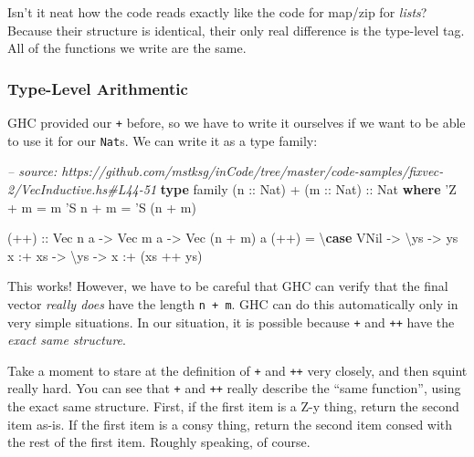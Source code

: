 \documentclass[]{article}
\newenvironment{Shaded}{}{}
\newcommand{\KeywordTok}[1]{\textcolor[rgb]{0.00,0.44,0.13}{\textbf{#1}}}
\newcommand{\DataTypeTok}[1]{\textcolor[rgb]{0.56,0.13,0.00}{#1}}
\newcommand{\CharTok}[1]{\textcolor[rgb]{0.25,0.44,0.63}{#1}}
\newcommand{\CommentTok}[1]{\textcolor[rgb]{0.38,0.63,0.69}{\textit{#1}}}
\newcommand{\OtherTok}[1]{\textcolor[rgb]{0.00,0.44,0.13}{#1}}
\newcommand{\FunctionTok}[1]{\textcolor[rgb]{0.02,0.16,0.49}{#1}}
\newcommand{\NormalTok}[1]{#1}
\begin{document}
Isn't it neat how the code reads exactly like the code for map/zip for
\emph{lists}? Because their structure is identical, their only real difference
is the type-level tag. All of the functions we write are the same.

\subsubsection{Type-Level Arithmentic}\label{type-level-arithmentic}

GHC provided our \texttt{+} before, so we have to write it ourselves if we want
to be able to use it for our \texttt{Nat}s. We can write it as a type family:

\begin{Shaded}
\begin{Highlighting}[]
\CommentTok{-- source: https://github.com/mstksg/inCode/tree/master/code-samples/fixvec-2/VecInductive.hs#L44-51}
\KeywordTok{type}\NormalTok{ family (}\OtherTok{n ::} \DataTypeTok{Nat}\NormalTok{) }\FunctionTok{+}\NormalTok{ (}\OtherTok{m ::} \DataTypeTok{Nat}\NormalTok{)}\OtherTok{ ::} \DataTypeTok{Nat} \KeywordTok{where}
    \CharTok{'Z   + m = m}
    \CharTok{'S n + m = '}\DataTypeTok{S}\NormalTok{ (n }\FunctionTok{+}\NormalTok{ m)}

\OtherTok{(++) ::} \DataTypeTok{Vec}\NormalTok{ n a }\OtherTok{->} \DataTypeTok{Vec}\NormalTok{ m a }\OtherTok{->} \DataTypeTok{Vec}\NormalTok{ (n }\FunctionTok{+}\NormalTok{ m) a}
\NormalTok{(}\FunctionTok{++}\NormalTok{) }\FunctionTok{=}\NormalTok{ \textbackslash{}}\KeywordTok{case}
    \DataTypeTok{VNil}    \OtherTok{->}\NormalTok{ \textbackslash{}ys }\OtherTok{->}\NormalTok{ ys}
\NormalTok{    x }\FunctionTok{:+}\NormalTok{ xs }\OtherTok{->}\NormalTok{ \textbackslash{}ys }\OtherTok{->}\NormalTok{ x }\FunctionTok{:+}\NormalTok{ (xs }\FunctionTok{++}\NormalTok{ ys)}
\end{Highlighting}
\end{Shaded}

This works! However, we have to be careful that GHC can verify that the final
vector \emph{really does} have the length \texttt{n\ +\ m}. GHC can do this
automatically only in very simple situations. In our situation, it is possible
because \texttt{+} and \texttt{++} have the \emph{exact same structure}.

Take a moment to stare at the definition of \texttt{+} and \texttt{++} very
closely, and then squint really hard. You can see that \texttt{+} and
\texttt{++} really describe the ``same function'', using the exact same
structure. First, if the first item is a Z-y thing, return the second item
as-is. If the first item is a consy thing, return the second item consed with
the rest of the first item. Roughly speaking, of course.
\end{document}
